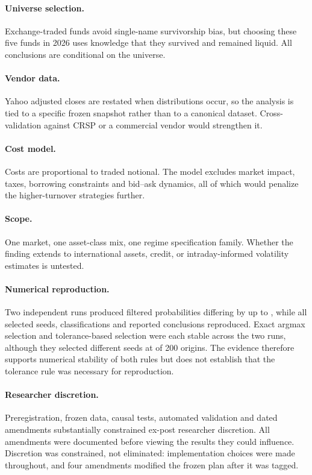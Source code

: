 \paragraph{Universe selection.} Exchange-traded funds avoid single-name
survivorship bias, but choosing these five funds in 2026 uses knowledge
that they survived and remained liquid. All conclusions are conditional
on the universe.

\paragraph{Vendor data.} Yahoo adjusted closes are restated when
distributions occur, so the analysis is tied to a specific frozen
snapshot rather than to a canonical dataset. Cross-validation against
CRSP or a commercial vendor would strengthen it.

\paragraph{Cost model.} Costs are proportional to traded notional. The
model excludes market impact, taxes, borrowing constraints and bid--ask
dynamics, all of which would penalize the higher-turnover strategies
further.

\paragraph{Scope.} One market, one asset-class mix, one regime
specification family. Whether the finding extends to international
assets, credit, or intraday-informed volatility estimates is untested.

\paragraph{Numerical reproduction.} Two independent runs produced
filtered probabilities differing by up to \reproductionMaxDifference{},
while all selected seeds, classifications and reported conclusions
reproduced. Exact argmax selection and tolerance-based selection were
each stable across the two runs, although they selected different seeds
at \argmaxToleranceDisagreements{} of
200 origins. The evidence therefore supports numerical stability of both
rules but does not establish that the tolerance rule was necessary for
reproduction.

\paragraph{Researcher discretion.} Preregistration, frozen data, causal
tests, automated validation and dated amendments substantially
constrained ex-post researcher discretion. All amendments were
documented before viewing the results they could influence. Discretion
was constrained, not eliminated: implementation choices were made
throughout, and four amendments modified the frozen plan after it was
tagged.
